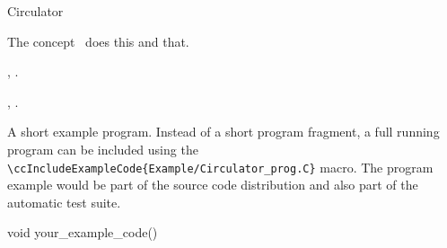 
\gdef\ccRefPageBegin{\ccParDims\cgalColumnLayout\begin{ccAdvanced}}
\gdef\ccRefPageEnd{\ccParDims\cgalColumnLayout\end{ccAdvanced}}
\begin{ccRefConcept}{Circulator}


\ccDefinition
  
The concept \ccRefName\ does this and that.

\ccTypes


\ccCreation
{}  %


\ccOperations


\clearpage
\ccHasModels

,
.

\ccSeeAlso

,
.

\ccExample

A short example program.
Instead of a short program fragment, a full running program can be
included using the 
\verb|\ccIncludeExampleCode{Example/Circulator_prog.C}| 
macro. The program example would be part of the source code distribution and
also part of the automatic test suite.

\begin{ccExampleCode}
void your_example_code() {
}
\end{ccExampleCode}


\end{ccRefConcept}
\gdef\ccRefPageBegin{\ccParDims\cgalColumnLayout}
\gdef\ccRefPageEnd{\ccParDims\cgalColumnLayout}


